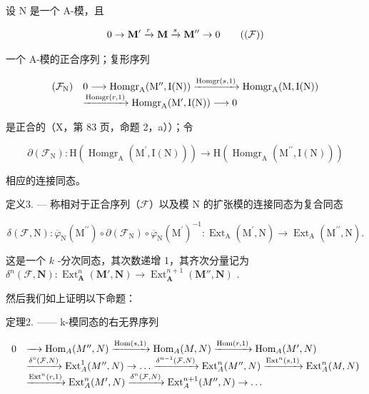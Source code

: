 设 N 是一个 A-模，且

\[
0 \rightarrow \mathbf {M} ^ {\prime} \xrightarrow {r} \mathbf {M} \xrightarrow {s} \mathbf {M} ^ {\prime \prime} \rightarrow 0\tag{$(\mathcal{F})$}
\]

一个 A-模的正合序列；复形序列

\[
\begin{array}{r l} (\mathcal {F} _ {\mathrm{N}}) & 0 \longrightarrow \operatorname{Homgr} _ {\mathrm{A}} (\mathrm{M} ^ {\prime \prime}, \mathrm{I} (\mathrm{N})) \xrightarrow {\operatorname{Homgr} (s , 1)} \operatorname{Homgr} _ {\mathrm{A}} (\mathrm{M}, \mathrm{I} (\mathrm{N})) \\ & \xrightarrow {\operatorname{Homgr} (r , 1)} \operatorname{Homgr} _ {\mathrm{A}} (\mathrm{M} ^ {\prime}, \mathrm{I} (\mathrm{N})) \longrightarrow 0 \end{array}
\]

是正合的（X，第 83 页，命题 2，a））；令

\[
\partial (\mathcal {F} _ {\mathrm{N}}): \mathrm{H} (\operatorname{Homgr} _ {\mathrm{A}} (\mathrm{M} ^ {\prime}, \mathrm{I} (\mathrm{N}))) \rightarrow \mathrm{H} (\operatorname{Homgr} _ {\mathrm{A}} (\mathrm{M} ^ {\prime \prime}, \mathrm{I} (\mathrm{N})))
\]

相应的连接同态。

定义3. --- 称相对于正合序列（\(\mathcal{F}\)）以及模 N 的扩张模的连接同态为复合同态

\[
\delta (\mathcal {F}, \mathrm{N}): \overline {{\varphi}} _ {\mathrm{N}} (\mathrm{M} ^ {\prime \prime}) \circ \partial (\mathcal {F} _ {\mathrm{N}}) \circ \overline {{\varphi}} _ {\mathrm{N}} (\mathrm{M} ^ {\prime}) ^ {- 1}: \operatorname{Ext} _ {\mathrm{A}} (\mathrm{M} ^ {\prime}, \mathrm{N}) \rightarrow \operatorname{Ext} _ {\mathrm{A}} (\mathrm{M} ^ {\prime \prime}, \mathrm{N}).
\]

这是一个 \(k\) -分次同态，其次数递增 1，其齐次分量记为 \(\delta^{n}(\mathcal{F}, \mathbf{N}) : \operatorname{Ext}_{\mathbf{A}}^{n}(\mathbf{M}', \mathbf{N}) \to \operatorname{Ext}_{\mathbf{A}}^{n+1}(\mathbf{M}'', \mathbf{N})\) .

然后我们如上证明以下命题：

定理2. —— k-模同态的右无界序列

\[
\begin{array}{r l} 0 & \xrightarrow {\quad} \operatorname{Hom} _ {A} (M ^ {\prime \prime}, N) \xrightarrow {\operatorname{Hom} (s , 1)} \operatorname{Hom} _ {A} (M, N) \xrightarrow {\operatorname{Hom} (r , 1)} \operatorname{Hom} _ {A} (M ^ {\prime}, N) \\ & \xrightarrow {\delta^ {\circ} (\mathcal {F} , N)} \operatorname{Ext} _ {A} ^ {1} (M ^ {\prime \prime}, N) \to \dots \xrightarrow {\delta^ {n - 1} (\mathcal {F} , N)} \operatorname{Ext} _ {A} ^ {n} (M ^ {\prime \prime}, N) \xrightarrow {\operatorname{Ext} ^ {n} (s , 1)} \operatorname{Ext} _ {A} ^ {n} (M, N) \\ & \xrightarrow {\operatorname{Ext} ^ {n} (r , 1)} \operatorname{Ext} _ {A} ^ {n} (M ^ {\prime}, N) \xrightarrow {\delta^ {n} (\mathcal {F} , N)} \operatorname{Ext} _ {A} ^ {n + 1} (M ^ {\prime \prime}, N) \to \dots \end{array}
\]

